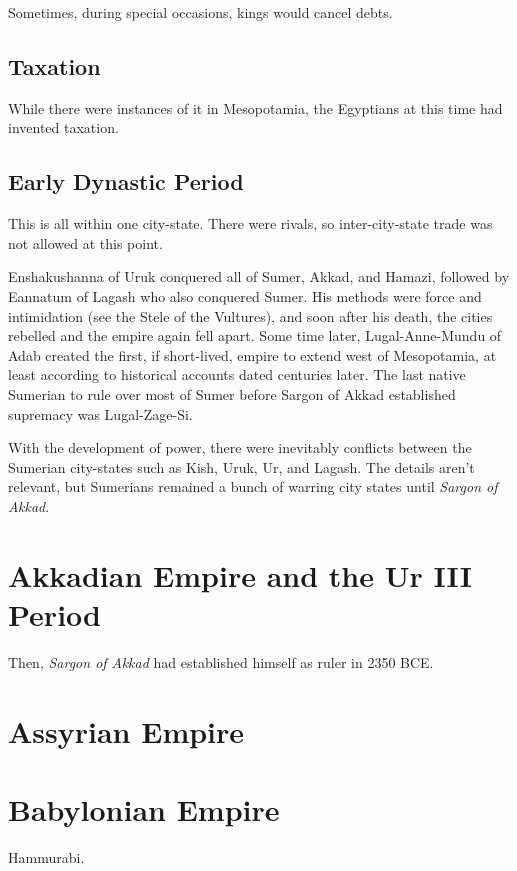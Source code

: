 \documentclass{article}
\begin{document}
    Sometimes, during special occasions, kings would cancel debts. 

  \subsection{Taxation} 

    \begin{definition}[Taxes]
      While there were instances of it in Mesopotamia, the Egyptians at this time had invented taxation. 
    \end{definition}


  \subsection{Early Dynastic Period}

    This is all within one city-state. There were rivals, so inter-city-state trade was not allowed at this point. 

    Enshakushanna of Uruk conquered all of Sumer, Akkad, and Hamazi, followed by Eannatum of Lagash who also conquered Sumer. His methods were force and intimidation (see the Stele of the Vultures), and soon after his death, the cities rebelled and the empire again fell apart. Some time later, Lugal-Anne-Mundu of Adab created the first, if short-lived, empire to extend west of Mesopotamia, at least according to historical accounts dated centuries later. The last native Sumerian to rule over most of Sumer before Sargon of Akkad established supremacy was Lugal-Zage-Si. 

    With the development of power, there were inevitably conflicts between the Sumerian city-states such as Kish, Uruk, Ur, and Lagash. The details aren't relevant, but Sumerians remained a bunch of warring city states until \textit{Sargon of Akkad}. 


\section{Akkadian Empire and the Ur III Period}

  Then, \textit{Sargon of Akkad} had established himself as ruler in 2350 BCE. 

\section{Assyrian Empire}



\section{Babylonian Empire}

  Hammurabi. 
\end{document}
